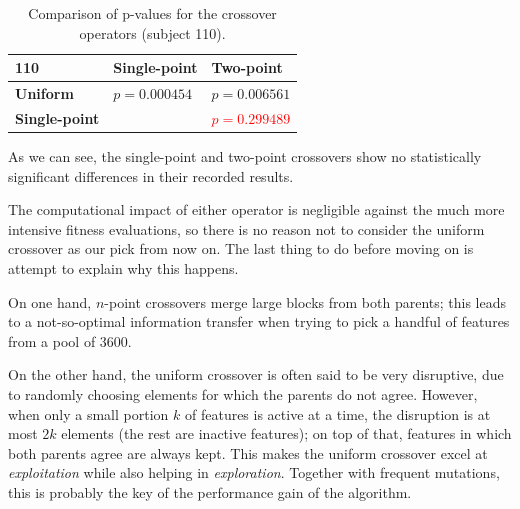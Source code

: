     \begin{table}[h]

        \centering
        \setlength\arrayrulewidth{0.8pt}

        \begin{tabular}{| >{\centering\arraybackslash}m{0.9in} |  >{\centering\arraybackslash}m{0.9in} | >{\centering\arraybackslash}m{0.9in} |}

            \hline
            \rowcolor{RoyalBlue}
            \textbf{110} & \textbf{Single-point} & \textbf{Two-point} \\
            \hline
            \cellcolor{RoyalBlue}\textbf{Uniform} & $p = 0.000454$ & $p = 0.006561$ \\
            \hline
            \cellcolor{RoyalBlue}\textbf{Single-point} & \cellcolor{lightgray} & \textcolor{red}{$p = 0.299489$} \\
            \hline

        \end{tabular}

        \caption{Comparison of p-values for the crossover operators (subject 110).}\label{table:crossover_kruskal_110}

    \end{table}

    As we can see, the single-point and two-point crossovers show no statistically significant differences in their recorded results.

    The computational impact of either operator is negligible against the much more intensive fitness evaluations, so there is no reason not to consider the uniform crossover as our pick from now on. The last thing to do before moving on is attempt to explain why this happens. 

    On one hand, $n$-point crossovers merge large blocks from both parents; this leads to a not-so-optimal information transfer when trying to pick a handful of features from a pool of 3600.

    On the other hand, the uniform crossover is often said to be very disruptive, due to randomly choosing elements for which the parents do not agree. However, when only a small portion $k$ of features is active at a time, the disruption is at most $2k$ elements (the rest are inactive features); on top of that, features in which both parents agree are always kept. This makes the uniform crossover excel at \textit{exploitation} while also helping in \textit{exploration}. Together with frequent mutations, this is probably the key of the performance gain of the algorithm.

